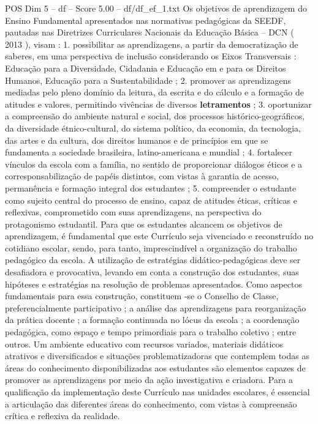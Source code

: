 \begin{textsample}{POS Dim 5 – df – Score 5.00 – df/df\_ef\_1.txt}
Os objetivos de aprendizagem do Ensino Fundamental apresentados nas normativas pedagógicas da SEEDF, pautadas nas Diretrizes Curriculares Nacionais da Educação Básica – DCN ( 2013 ), visam : 1. possibilitar as aprendizagens, a partir da democratização de saberes, em uma perspectiva de inclusão considerando os Eixos Transversais : Educação para a Diversidade, Cidadania e Educação em e para os Direitos Humanos, Educação para a Sustentabilidade ; 2. promover as aprendizagens mediadas pelo pleno domínio da leitura, da escrita e do cálculo e a formação de atitudes e valores, permitindo vivências de diversos \textbf{letramentos} ; 3. oportunizar a compreensão do ambiente natural e social, dos processos histórico-geográficos, da diversidade étnico-cultural, do sistema político, da economia, da tecnologia, das artes e da cultura, dos direitos humanos e de princípios em que se fundamenta a sociedade brasileira, latino-americana e mundial ; 4. fortalecer vínculos da escola com a família, no sentido de proporcionar diálogos éticos e a corresponsabilização de papéis distintos, com vistas à garantia de acesso, permanência e formação integral dos estudantes ; 5. compreender o estudante como sujeito central do processo de ensino, capaz de atitudes éticas, críticas e reflexivas, comprometido com suas aprendizagens, na perspectiva do protagonismo estudantil.
Para que os estudantes alcancem os objetivos de aprendizagem, é fundamental que este Currículo seja vivenciado e reconstruído no cotidiano escolar, sendo, para tanto, imprescindível a organização do trabalho pedagógico da escola.
A utilização de estratégias didático-pedagógicas deve ser desafiadora e provocativa, levando em conta a construção dos estudantes, suas hipóteses e estratégias na resolução de problemas apresentados.
Como aspectos fundamentais para essa construção, constituem -se o Conselho de Classe, preferencialmente participativo ; a análise das aprendizagens para reorganização da prática docente ; a formação continuada no lócus da escola ; a coordenação pedagógica, como espaço e tempo primordiais para o trabalho coletivo ; entre outros.
Um ambiente educativo com recursos variados, materiais didáticos atrativos e diversificados e situações problematizadoras que contemplem todas as áreas do conhecimento disponibilizadas aos estudantes são elementos capazes de promover as aprendizagens por meio da ação investigativa e criadora.
Para a qualificação da implementação deste Currículo nas unidades escolares, é essencial a articulação das diferentes áreas do conhecimento, com vistas à compreensão crítica e reflexiva da realidade.

\end{textsample}
